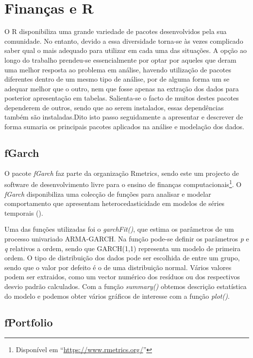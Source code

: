 \documentclass[
  12pt,
  a4paper,
  openany]{book}
\theoremstyle{definition}
\theoremstyle{definition}
\theoremstyle{definition}
\theoremstyle{remark}
\begin{document}
\hypertarget{finanuxe7as-e-r}{%
\section{Finanças e R}\label{finanuxe7as-e-r}}

O R disponibiliza uma grande variedade de pacotes desenvolvidos pela sua comunidade. No entanto, devido a essa diversidade torna-se às vezes complicado saber qual o mais adequado para utilizar em cada uma das situações. A opção ao longo do trabalho prendeu-se essencialmente por optar por aqueles que deram uma melhor resposta ao problema em análise, havendo utilização de pacotes diferentes dentro de um mesmo tipo de análise, por de alguma forma um se adequar melhor que o outro, nem que fosse apenas na extração dos dados para posterior apresentação em tabelas. Salienta-se o facto de muitos destes pacotes dependerem de outros, sendo que ao serem instalados, essas dependências também são instaladas.Dito isto passo seguidamente a apresentar e descrever de forma sumaria os principais pacotes aplicados na análise e modelação dos dados.

\hypertarget{fgarch}{%
\subsection{fGarch}\label{fgarch}}

O pacote \emph{fGarch} faz parte da organização Rmetrics, sendo este um projecto de software de desenvolvimento livre para o ensino de finanças computacionais\footnote{Disponível em ``\url{https://www.rmetrics.org/}''}. O \emph{fGarch} disponibiliza uma colecção de funções para analisar e modelar comportamento que apresentam heterocedasticidade em modelos de séries temporais (\citet{fGarch}).

Uma das funções utilizadas foi o \emph{garchFit()}, que estima os parâmetros de um processo univariado ARMA-GARCH. Na função pode-se definir os parâmetros \emph{p} e \emph{q} relativos a ordem, sendo que GARCH(1,1) representa um modelo de primeira ordem. O tipo de distribuição dos dados pode ser escolhida de entre um grupo, sendo que o valor por defeito é o de uma distribuição normal. Vários valores podem ser extraidos, como um vector numérico dos resíduos ou dos respectivos desvio padrão calculados. Com a função \emph{summary()} obtemos descrição estatística do modelo e podemos obter vários gráficos de interesse com a função \emph{plot()}.

\hypertarget{fportfolio}{%
\subsection{fPortfolio}\label{fportfolio}}
\end{document}
